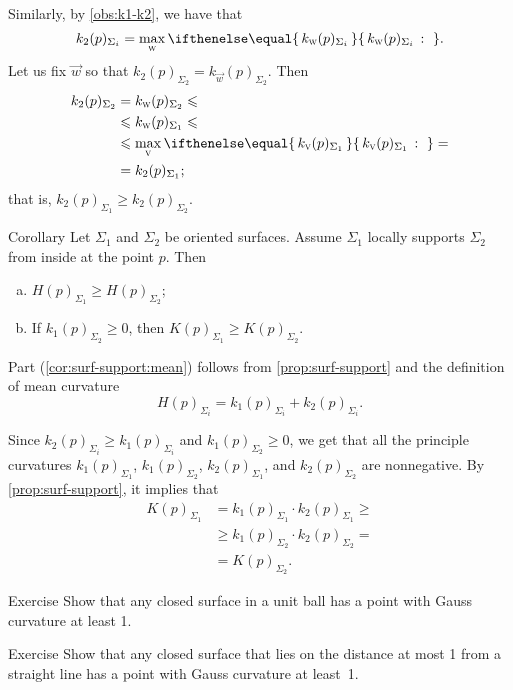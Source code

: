 Similarly, by \ref{obs:k1-k2}, we have that
\[k_2(p)_{\Sigma_i}=\max_{\vec w}\set{k_{\vec w}(p)_{\Sigma_i}}{}.\]
Let us fix ${\vec w}$ so that $k_2(p)_{\Sigma_2}=k_{\vec w}(p)_{\Sigma_2}$.
Then 
\begin{align*}
k_2(p)_{\Sigma_2}&=k_{\vec w}(p)_{\Sigma_2}\le
\\
&\le k_{\vec w}(p)_{\Sigma_1}\le
\\
&\le\max_{\vec v}\set{k_{\vec v}(p)_{\Sigma_1}}{}=
\\
&=k_2(p)_{\Sigma_1};
\end{align*}
that is, $k_2(p)_{\Sigma_1}\ge k_2(p)_{\Sigma_2}$.
\qeds

\begin{thm}{Corollary}\label{cor:surf-support}
Let $\Sigma_1$ and $\Sigma_2$ be oriented surfaces.
Assume $\Sigma_1$ locally supports $\Sigma_2$ from inside at the point $p$.
Then
\begin{enumerate}[(a)]
\item\label{cor:surf-support:mean} $H(p)_{\Sigma_1}\ge H(p)_{\Sigma_2}$;
\item\label{cor:surf-support:gauss} If $k_1(p)_{\Sigma_2}\ge 0$, then $K(p)_{\Sigma_1}\ge K(p)_{\Sigma_2}$.
\end{enumerate}
 
\end{thm}

Part (\ref{cor:surf-support:mean}) follows from  \ref{prop:surf-support} and the definition of mean curvature
\[H(p)_{\Sigma_i}=k_1(p)_{\Sigma_i}+k_2(p)_{\Sigma_i}.\]


 Since $k_2(p)_{\Sigma_i}\ge k_1(p)_{\Sigma_i}$ and $k_1(p)_{\Sigma_2}\ge 0$, we get that all the principle curvatures 
$k_1(p)_{\Sigma_1}$, 
$k_1(p)_{\Sigma_2}$, 
$k_2(p)_{\Sigma_1}$, and 
$k_2(p)_{\Sigma_2}$ are nonnegative.
By \ref{prop:surf-support}, it implies that
\begin{align*}
K(p)_{\Sigma_1}&=k_1(p)_{\Sigma_1}\cdot k_2(p)_{\Sigma_1}\ge 
\\
&\ge k_1(p)_{\Sigma_2}\cdot k_2(p)_{\Sigma_2}=
\\
&=K(p)_{\Sigma_2}.
\end{align*}
\qedsf

\begin{thm}{Exercise}\label{ex:positive-gauss-0}
Show that any closed surface in a unit ball has a point with Gauss curvature at least 1.
\end{thm}

\begin{thm}{Exercise}\label{ex:positive-gauss}
Show that any closed surface that lies on the distance at most 1 from a straight line has a point with Gauss curvature at least~1.
\end{thm}

